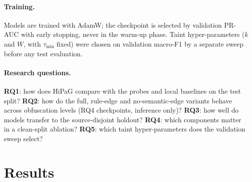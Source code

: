 \documentclass[pdflatex,sn-mathphys-num]{sn-jnl}
\begin{document}
\paragraph{Training.} Models are trained with AdamW; the checkpoint is selected
by validation PR-AUC with early stopping, never in the warm-up phase. Taint
hyper-parameters ($k$ and $W$, with $\tau_{\min}$ fixed) were chosen on
validation macro-F1 by a separate sweep before any test evaluation.

\paragraph{Research questions.} \textbf{RQ1}: how does HiPaG compare with the
probes and local baselines on the test split? \textbf{RQ2}: how do the full,
rule-edge and no-semantic-edge variants behave across obfuscation levels (RQ4
checkpoints, inference only)? \textbf{RQ3}: how well do models transfer to the
source-disjoint holdout? \textbf{RQ4}: which components matter in a clean-split
ablation? \textbf{RQ5}: which taint hyper-parameters does the validation sweep
select?

\section{Results}\label{sec:results}
\end{document}
